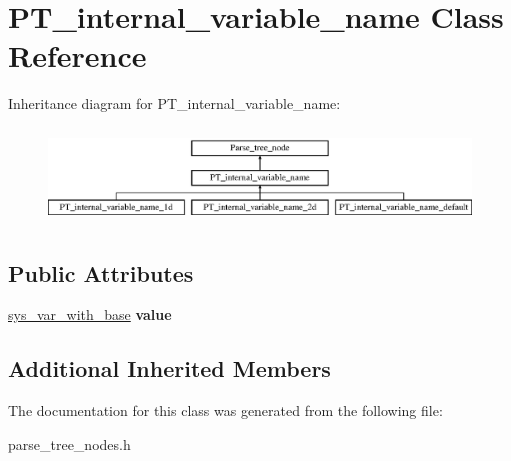 \hypertarget{classPT__internal__variable__name}{}\section{P\+T\+\_\+internal\+\_\+variable\+\_\+name Class Reference}
\label{classPT__internal__variable__name}
Inheritance diagram for P\+T\+\_\+internal\+\_\+variable\+\_\+name\+:\begin{figure}[H]
\begin{center}
\leavevmode
\includegraphics[height=2.557078cm]{classPT__internal__variable__name}
\end{center}
\end{figure}
\subsection*{Public Attributes}
\begin{DoxyCompactItemize}
\item 
\mbox{\label{classPT__internal__variable__name_a218d5f4bee33dbb1324ffad0ff558868}} 
\mbox{\hyperlink{structsys__var__with__base}{sys\+\_\+var\+\_\+with\+\_\+base}} {\bfseries value}
\end{DoxyCompactItemize}
\subsection*{Additional Inherited Members}


The documentation for this class was generated from the following file\+:\begin{DoxyCompactItemize}
\item 
parse\+\_\+tree\+\_\+nodes.\+h\end{DoxyCompactItemize}
